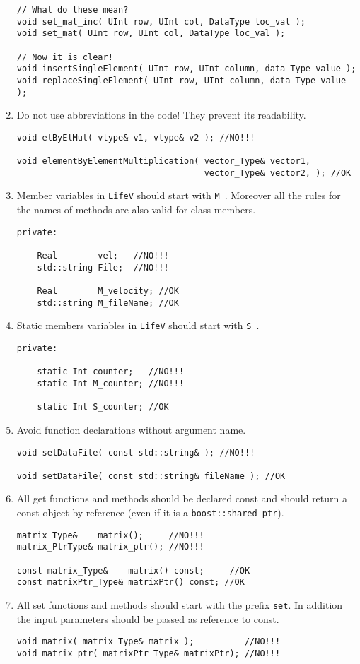 \documentclass[10p]{article}
\begin{document}
\begin{enumerate}
\begin{lstlisting}
// What do these mean?
void set_mat_inc( UInt row, UInt col, DataType loc_val );
void set_mat( UInt row, UInt col, DataType loc_val );

// Now it is clear!
void insertSingleElement( UInt row, UInt column, data_Type value );
void replaceSingleElement( UInt row, UInt column, data_Type value );

  \end{lstlisting}
  \item Do not use abbreviations in the code! They prevent its readability.
\begin{lstlisting}
void elByElMul( vtype& v1, vtype& v2 ); //NO!!!

void elementByElementMultiplication( vector_Type& vector1,
                                     vector_Type& vector2, ); //OK
\end{lstlisting}
  \item Member variables in \texttt{LifeV} should start with \texttt{M\_}. Moreover all the rules for the names of methods are also valid for class members.
\begin{lstlisting}
private:

    Real        vel;   //NO!!!
    std::string File;  //NO!!!

    Real        M_velocity; //OK
    std::string M_fileName; //OK
\end{lstlisting}
  \item Static members variables in \texttt{LifeV} should start with \texttt{S\_}.
\begin{lstlisting}
private:

    static Int counter;   //NO!!!
    static Int M_counter; //NO!!!

    static Int S_counter; //OK
\end{lstlisting}
  \item Avoid function declarations without argument name.
\begin{lstlisting}
void setDataFile( const std::string& ); //NO!!!

void setDataFile( const std::string& fileName ); //OK
\end{lstlisting}
  \item All get functions and methods should be declared const and should return a const object by reference (even if it is a \texttt{boost::shared\_ptr}).
\begin{lstlisting}
matrix_Type&    matrix();     //NO!!!
matrix_PtrType& matrix_ptr(); //NO!!!

const matrix_Type&    matrix() const;     //OK
const matrixPtr_Type& matrixPtr() const; //OK
\end{lstlisting}
  \item All set functions and methods should start with the prefix \texttt{set}. In addition the input parameters should be passed as reference to const.
\begin{lstlisting}
void matrix( matrix_Type& matrix );          //NO!!!
void matrix_ptr( matrixPtr_Type& matrixPtr); //NO!!!


\end{lstlisting}
\end{enumerate}
\end{document}
